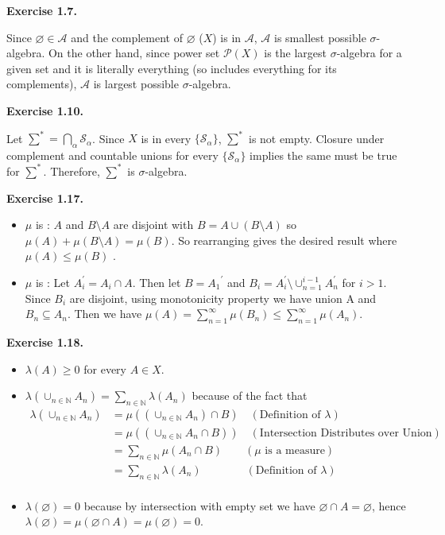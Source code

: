 \documentclass[12pt]{article}
\renewcommand{\emptyset}{\varnothing}
\begin{document}
\textbf{Exercise 1.7.}

Since $\emptyset \in \mathcal{A}$ and the complement of $\emptyset$ ($X$) is in $\mathcal{A}$, $\mathcal{A}$ is smallest possible $\sigma$-algebra. On the other hand, since power set $\mathcal{P}(X)$ is the largest $\sigma$-algebra for a given set and it is literally everything (so includes everything for its complements), $\mathcal{A}$ is largest possible $\sigma$-algebra.

\textbf{Exercise 1.10.}

Let $\sum^{*} = \bigcap_\alpha \mathcal{S}_\alpha$. Since $X$ is in every $\{\mathcal{S}_\alpha\}$, $\sum^{*}$ is not empty. Closure under complement and countable unions for every  $\{\mathcal{S}_\alpha\}$ implies the same must be true for $\sum^{*}$.  Therefore,  $\sum^{*}$ is $\sigma$-algebra.

\textbf{Exercise 1.17.}

\begin{itemize}
\item $\mu$ is : $A$ and $B \setminus A$ are disjoint with $ B = A \cup (B \setminus A)$ so $\mu(A) + \mu (B \setminus A) = \mu(B)$. So rearranging gives the desired result where $\mu(A) \leq \mu(B)$  .

\item  $\mu$ is : Let $A_{i}^{'} = A_{i} \cap A$. Then let $B = {A_{1}}^{'}$ and $B_{i} = A_{i}^{'} \setminus \cup_{n=1}^{i-1} A_{n}^{'}$ for $i>1$. Since $B_{i}$ are disjoint, using monotonicity property we have union A and $B_{n} \subseteq A_{n}$. Then we have $\mu(A) = \sum_{n=1}^{\infty} \mu({B_{n}}) \leq  \sum_{n=1}^{\infty} \mu({A_{n}})$.

\end{itemize}

\textbf{Exercise 1.18.}
\begin{itemize}
\item $\lambda(A) \geq 0$ for every $A \in X$.
\item $\lambda(\cup_{n \in \mathbb{N}} A_{n}) = \sum_{n \in \mathbb{N}} \lambda(A_{n})$ because of the fact that 
\begin{align*}
\lambda(\cup_{n \in \mathbb{N}} A_{n}) & = \mu((\cup_{n \in \mathbb{N}} A_{n}) \cap B) \quad (\text{Definition of $\lambda$})\\ & = \mu((\cup_{n \in \mathbb{N}} A_{n} \cap B)) \quad (\text{Intersection Distributes over Union})\\ & = \sum_{n \in \mathbb{N}} \mu(A_{n} \cap B)  \quad \quad (\text{$\mu$ is a measure}) \\ & = \sum_{n \in \mathbb{N}} \lambda(A_{n}) \quad \quad \quad \quad (\text{Definition of $\lambda$})\\
\end{align*}
\item  $\lambda(\emptyset) = 0$ because by intersection with empty set we have $\emptyset \cap A = \emptyset$, hence $\lambda(\emptyset) = \mu(\emptyset \cap A) =  \mu(\emptyset) = 0$.

\end{itemize}
\end{document}
